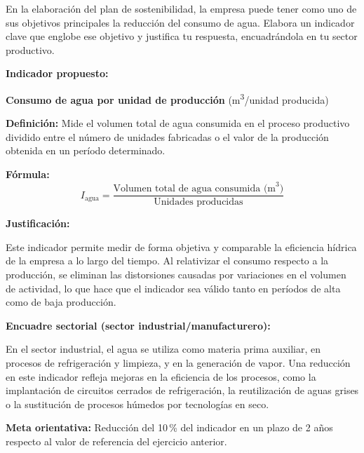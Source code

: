 {
	En la elaboración del plan de sostenibilidad, la empresa puede tener como uno de sus objetivos
	principales la reducción del consumo de agua. Elabora un indicador clave que englobe ese objetivo
	y justifica tu respuesta, encuadrándola en tu sector productivo.
}

\begin{solution}

	\textbf{Indicador propuesto:}

	\textbf{Consumo de agua por unidad de producción} (m\textsuperscript{3}/unidad producida)

	\medskip

	\textbf{Definición:} Mide el volumen total de agua consumida en el proceso productivo dividido entre
	el número de unidades fabricadas o el valor de la producción obtenida en un período determinado.

	\medskip

	\textbf{Fórmula:}
	\[
		I_{\text{agua}} = \frac{\text{Volumen total de agua consumida (m}^3\text{)}}{\text{Unidades producidas}}
	\]

	\medskip

	\textbf{Justificación:}

	Este indicador permite medir de forma objetiva y comparable la eficiencia hídrica de la empresa a
	lo largo del tiempo. Al relativizar el consumo respecto a la producción, se eliminan las distorsiones
	causadas por variaciones en el volumen de actividad, lo que hace que el indicador sea válido tanto
	en períodos de alta como de baja producción.

	\medskip

	\textbf{Encuadre sectorial (sector industrial/manufacturero):}

	En el sector industrial, el agua se utiliza como materia prima auxiliar, en procesos de refrigeración
	y limpieza, y en la generación de vapor. Una reducción en este indicador refleja mejoras en la
	eficiencia de los procesos, como la implantación de circuitos cerrados de refrigeración, la
	reutilización de aguas grises o la sustitución de procesos húmedos por tecnologías en seco.

	\medskip

	\textbf{Meta orientativa:} Reducción del 10\,\% del indicador en un plazo de 2 años respecto al
	valor de referencia del ejercicio anterior.

\end{solution}
